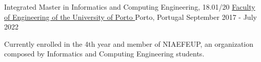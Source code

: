 
\begin{cventries}
  \cventry
    {Integrated Master in Informatics and Computing Engineering, 18.01/20} %
    {\href{https://sigarra.up.pt/feup/en/ucurr_geral.ficha_uc_view?pv_ocorrencia_id=459473}{Faculty of Engineering of the University of Porto \faExternalLink}} %
    {Porto, Portugal} %
    {September 2017 - July 2022} %
    {
      \begin{cvitems}
        \item {Currently enrolled in the 4th year and member of NIAEFEUP, an organization composed by Informatics and Computing Engineering students.}
      \end{cvitems}
    }
\end{cventries}
